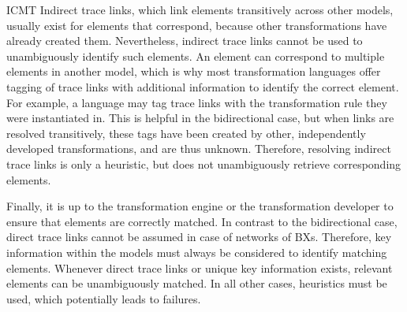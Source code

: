 \begin{copiedFrom}{ICMT}
Indirect trace links, which link elements transitively across other models, usually exist for elements that correspond, because other transformations have already created them.
Nevertheless, indirect trace links cannot be used to unambiguously identify such elements.
An element can correspond to multiple elements in another model, which is why most transformation languages offer tagging of trace links with additional information to identify the correct element.
For example, a language may tag trace links with the transformation rule they were instantiated in.
This is helpful in the bidirectional case, but when links are resolved transitively, these tags have been created by other, independently developed transformations, and are thus unknown.
Therefore, resolving indirect trace links is only a heuristic, but does not unambiguously retrieve corresponding elements.



Finally, it is up to the transformation engine or the transformation developer %
to ensure that elements are correctly matched.
In contrast to the bidirectional case, direct trace links cannot be assumed in case of networks of \acp{BX}.
Therefore, key information within the models must always be considered to identify matching elements.
Whenever direct trace links or unique key information exists, relevant elements can be unambiguously matched.
In all other cases, heuristics must be used, which potentially leads to failures.

\end{copiedFrom} %



